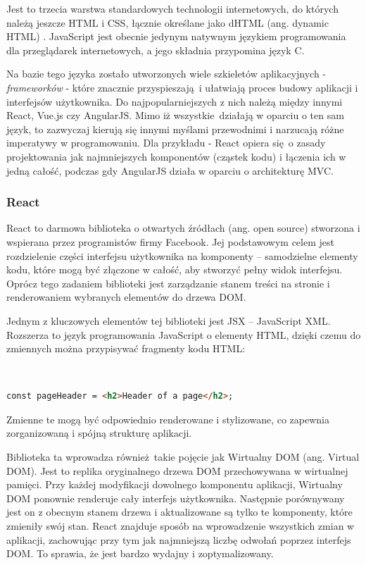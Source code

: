\documentclass[12pt,twoside]{article}
\begin{document}
Jest to trzecia warstwa standardowych technologii internetowych, do których należą jeszcze HTML i CSS, łącznie określane jako dHTML (ang. dynamic HTML) \cite{JS}. JavaScript jest obecnie jedynym natywnym językiem programowania dla przeglądarek internetowych, a jego składnia przypomina język C. 

Na bazie tego języka zostało utworzonych wiele szkieletów aplikacyjnych - \emph{frameworków} -  które znacznie przyspieszają i ułatwiają proces budowy aplikacji i interfejsów użytkownika. Do najpopularniejszych z nich należą między innymi React, Vue.js czy AngularJS. Mimo iż wszystkie działają w oparciu o ten sam język, to zazwyczaj kierują się innymi myślami przewodnimi i narzucają różne imperatywy w programowaniu. Dla przykładu - React opiera się o zasady projektowania jak najmniejszych komponentów (cząstek kodu) i łączenia ich w jedną całość, podczas gdy AngularJS działa w oparciu o architekturę MVC.

\subsubsection{React}

React to darmowa biblioteka o otwartych źródłach (ang. open source) stworzona i wspierana przez programistów firmy Facebook. Jej podstawowym celem jest rozdzielenie części interfejsu użytkownika na komponenty -- samodzielne elementy kodu, które mogą być złączone w całość, aby stworzyć pełny widok interfejsu. Oprócz tego zadaniem biblioteki jest zarządzanie stanem treści na stronie i renderowaniem wybranych elementów do drzewa DOM. 

Jednym z kluczowych elementów tej biblioteki jest JSX -- JavaScript XML. Rozszerza to język programowania JavaScript o elementy HTML, dzięki czemu do zmiennych można przypisywać fragmenty kodu HTML:

\

\begin{lstlisting}[language=HTML,caption=Nagłówek strony w wykonany w składni JSX,label={KodJS}]
	const pageHeader = <h2>Header of a page</h2>;
\end{lstlisting}

Zmienne te mogą być odpowiednio renderowane i stylizowane, co zapewnia zorganizowaną i spójną strukturę aplikacji.

Biblioteka ta wprowadza również takie pojęcie jak Wirtualny DOM (ang. Virtual DOM). Jest to replika oryginalnego drzewa DOM przechowywana w wirtualnej pamięci. Przy każdej modyfikacji dowolnego komponentu aplikacji, Wirtualny DOM ponownie renderuje cały interfejs użytkownika. Następnie porównywany jest on z obecnym stanem drzewa i aktualizowane są tylko te komponenty, które zmieniły swój stan. React znajduje sposób na wprowadzenie wszystkich zmian w aplikacji, zachowując przy tym jak najmniejszą liczbę odwołań poprzez interfejs DOM. To sprawia, że jest bardzo wydajny i zoptymalizowany.
\end{document}

